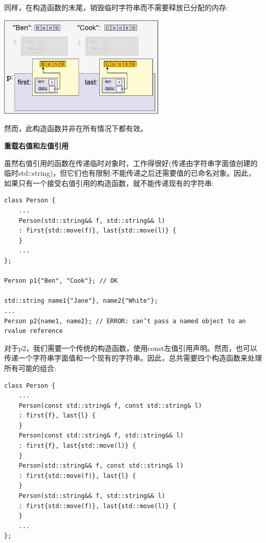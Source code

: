 同样，在构造函数的末尾，销毁临时字符串而不需要释放已分配的内存:\par

\begin{center}
	\includegraphics[width=0.6\textwidth]{content/1/chapter4/images/11}
\end{center}

然而，此构造函数并非在所有情况下都有效。\par

\hspace*{\fill} \par %
\textbf{重载右值和左值引用}

虽然右值引用的函数在传递临时对象时，工作得很好(传递由字符串字面值创建的临时std::string)，但它们也有限制:不能传递之后还需要值的已命名对象。因此，如果只有一个接受右值引用的构造函数，就不能传递现有的字符串:\par

\begin{lstlisting}[caption={}]
class Person {
	...
	Person(std::string&& f, std::string&& l)
	: first{std::move(f)}, last{std::move(l)} {
	}
	...
};

Person p1{"Ben", "Cook"}; // OK

std::string name1{"Jane"}, name2{"White"};
...
Person p2{name1, name2}; // ERROR: can’t pass a named object to an rvalue reference
\end{lstlisting}

对于p2，我们需要一个传统的构造函数，使用const左值引用声明。然而，也可以传递一个字符串字面值和一个现有的字符串。因此，总共需要四个构造函数来处理所有可能的组合:\par

\begin{lstlisting}[caption={}]
class Person {
	...
	Person(const std::string& f, const std::string& l)
	: first{f}, last{l} {
	}
	Person(const std::string& f, std::string&& l)
	: first{f}, last{std::move(l)} {
	}
	Person(std::string&& f, const std::string& l)
	: first{std::move(f)}, last{l} {
	}
	Person(std::string&& f, std::string&& l)
	: first{std::move(f)}, last{std::move(l)} {
	}
	...
};
\end{lstlisting}


